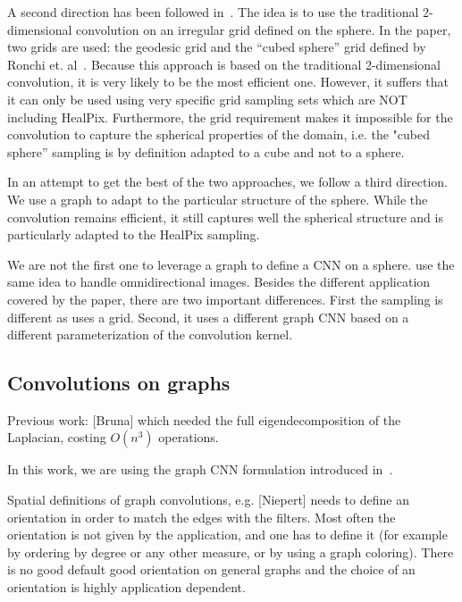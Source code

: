 \documentclass[final,twocolumn,3p,times,authoryear]{elsarticle}
\newcommand{\nati}[1]{{\color[rgb]{.1,.6,.1}{#1}}}
\newcommand{\todo}[1]{{\color[rgb]{.6,.1,.6}{#1}}}
\newcommand{\assign}[1]{{\color[rgb]{.8,.5,.8}{Assigned: #1 }}}
\newcommand{\1}{\b{1}}              %
\newcommand{\0}{\b{0}}              %
\begin{document}
A second direction has been followed in~\cite{boomsma2017spherical}. The idea is
to use the traditional 2-dimensional convolution on an irregular grid defined on the
sphere. In the paper, two grids are used: the geodesic grid and the “cubed
sphere” grid defined by Ronchi et. al~\cite{ronchi1996cubed}. Because this
approach is based on the traditional 2-dimensional convolution, it is very likely to be the
most efficient one. However, it suffers that it can only be used using very
specific grid sampling sets which are NOT including HealPix. Furthermore, the
grid requirement makes it impossible for the convolution to capture the
spherical properties of the domain, i.e. the "cubed sphere” sampling is by
definition adapted to a cube and not to a sphere. 

In an attempt to get the best of the two approaches, we follow a third
direction. We use a graph to adapt to the particular structure of the sphere.
While the convolution remains efficient, it still captures well the spherical
structure and is particularly adapted to the HealPix sampling.

We are not the first one to leverage a graph to define a CNN on a sphere.
\cite{khasanova2017graph} use the same idea to handle omnidirectional images.
Besides the different application covered by the paper, there are two important
differences. First the sampling is different as \cite{khasanova2017graph} uses a
grid. Second, it uses a different graph CNN based on a different parameterization
of the convolution kernel.


\subsection{Convolutions on graphs}
\assign{Michaël}

\todo{other approaches? GNNs, Kipf first order approx, message passing}

Previous work: [Bruna] which needed the full eigendecomposition of the Laplacian, costing $O(n^3)$ operations.

In this work, we are using the graph CNN formulation introduced in~\cite{defferrard2016convolutional}.

Spatial definitions of graph convolutions, e.g. [Niepert] needs to define an orientation in order to match the edges with the filters. Most often the orientation is not given by the application, and one has to define it (for example by ordering by degree or any other measure, or by using a graph coloring). There is no good default good orientation on general graphs and the choice of an orientation is highly application dependent.
\end{document}

